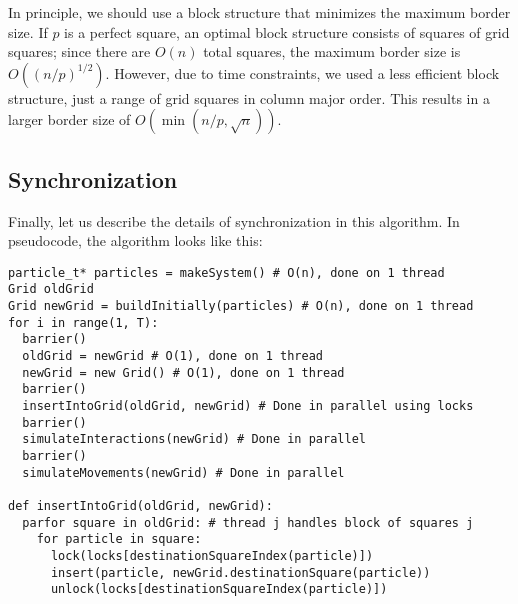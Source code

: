 \documentclass{article}
\begin{document}
In principle, we should use a block structure that minimizes the maximum border size.  If $p$ is a perfect square, an optimal block structure consists of squares of grid squares; since there are $O(n)$ total squares, the maximum border size is $O((n/p)^{1/2})$.  However, due to time constraints, we used a less efficient block structure, just a range of grid squares in column major order.  This results in a larger border size of $O(\min(n/p, \sqrt{n}))$.

\subsection{Synchronization}
Finally, let us describe the details of synchronization in this algorithm.  In pseudocode, the algorithm looks like this:

\begin{verbatim}
particle_t* particles = makeSystem() # O(n), done on 1 thread
Grid oldGrid
Grid newGrid = buildInitially(particles) # O(n), done on 1 thread
for i in range(1, T):
  barrier()
  oldGrid = newGrid # O(1), done on 1 thread
  newGrid = new Grid() # O(1), done on 1 thread
  barrier()
  insertIntoGrid(oldGrid, newGrid) # Done in parallel using locks
  barrier()
  simulateInteractions(newGrid) # Done in parallel
  barrier()
  simulateMovements(newGrid) # Done in parallel

def insertIntoGrid(oldGrid, newGrid):
  parfor square in oldGrid: # thread j handles block of squares j
    for particle in square:
      lock(locks[destinationSquareIndex(particle)])
      insert(particle, newGrid.destinationSquare(particle))
      unlock(locks[destinationSquareIndex(particle)])
\end{verbatim}
\end{document}
